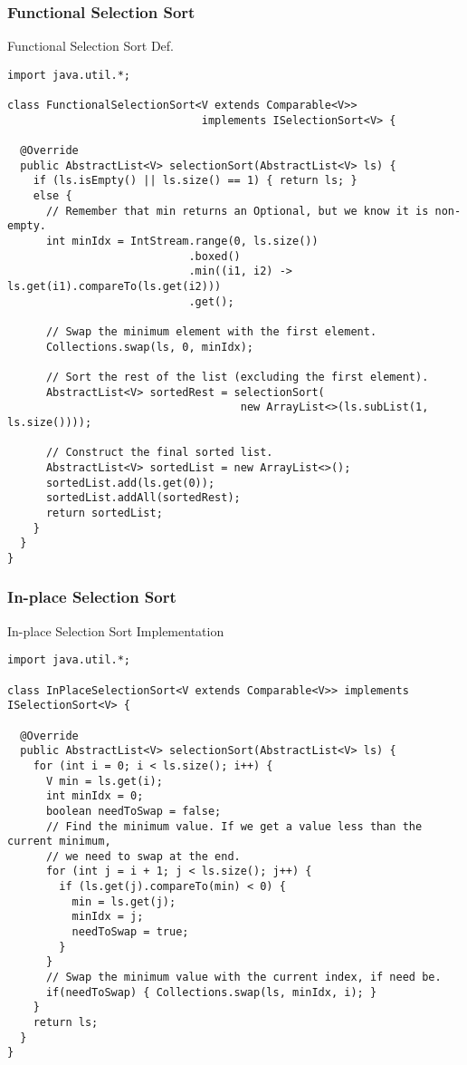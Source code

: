 \subsubsection*{Functional Selection Sort}
\begin{cl}[]{Functional Selection Sort Def.}
\begin{lstlisting}[language=MyJava]
import java.util.*;

class FunctionalSelectionSort<V extends Comparable<V>> 
                              implements ISelectionSort<V> {

  @Override
  public AbstractList<V> selectionSort(AbstractList<V> ls) {
    if (ls.isEmpty() || ls.size() == 1) { return ls; }
    else {
      // Remember that min returns an Optional, but we know it is non-empty.
      int minIdx = IntStream.range(0, ls.size())
                            .boxed()
                            .min((i1, i2) -> ls.get(i1).compareTo(ls.get(i2)))
                            .get();

      // Swap the minimum element with the first element.
      Collections.swap(ls, 0, minIdx);

      // Sort the rest of the list (excluding the first element).
      AbstractList<V> sortedRest = selectionSort(
                                    new ArrayList<>(ls.subList(1, ls.size())));

      // Construct the final sorted list.
      AbstractList<V> sortedList = new ArrayList<>();
      sortedList.add(ls.get(0));
      sortedList.addAll(sortedRest);
      return sortedList;
    }
  }
}
\end{lstlisting}
\end{cl}

\subsubsection*{In-place Selection Sort}
\begin{cl}[]{In-place Selection Sort Implementation}
\begin{lstlisting}[language=MyJava]
import java.util.*;

class InPlaceSelectionSort<V extends Comparable<V>> implements ISelectionSort<V> {
  
  @Override
  public AbstractList<V> selectionSort(AbstractList<V> ls) {
    for (int i = 0; i < ls.size(); i++) {
      V min = ls.get(i);
      int minIdx = 0;
      boolean needToSwap = false;
      // Find the minimum value. If we get a value less than the current minimum,
      // we need to swap at the end.
      for (int j = i + 1; j < ls.size(); j++) {
        if (ls.get(j).compareTo(min) < 0) {
          min = ls.get(j);
          minIdx = j;
          needToSwap = true;
        }
      }
      // Swap the minimum value with the current index, if need be.
      if(needToSwap) { Collections.swap(ls, minIdx, i); }
    }
    return ls;
  }
}
\end{lstlisting}  
\end{cl}

